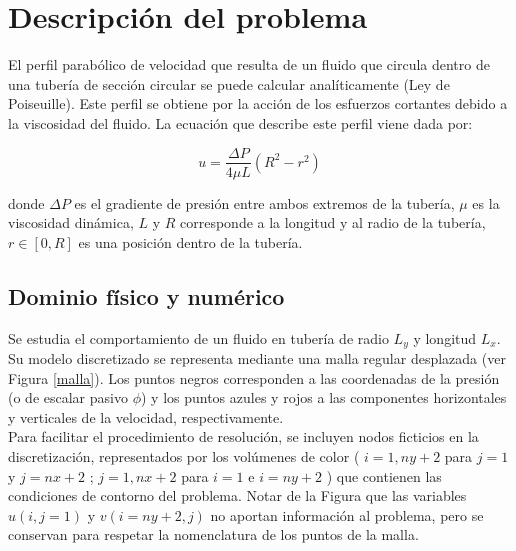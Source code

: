 \section{ Descripción del problema }

El perfil parabólico de velocidad que resulta de un fluido que circula dentro de una tubería de sección circular se puede calcular analíticamente (Ley de Poiseuille). Este perfil se obtiene por la acción de los esfuerzos cortantes debido a la viscosidad del fluido. La ecuación que describe este perfil viene dada por:

\begin{equation}
u = \dfrac{\Delta P}{4 \mu L } \left( R^2 - r^2 \right)
\end{equation} 

donde $\Delta P$ es el gradiente de presión entre ambos extremos de la tubería, $\mu$ es la viscosidad dinámica, $L$ y $R$ corresponde a la longitud y al radio de la tubería, $r \in [0,R]$ es una posición dentro de la tubería.

\subsection{Dominio físico y numérico}

Se estudia el comportamiento de un fluido en tubería de radio $L_y$ y longitud $L_x$. Su modelo discretizado se representa mediante una malla regular desplazada (ver Figura \ref{malla}). Los puntos negros corresponden a las coordenadas de la presión (o de escalar pasivo $\phi$) y los puntos azules y rojos a las componentes horizontales y verticales de la velocidad, respectivamente. \\ 

Para facilitar el procedimiento de resolución, se incluyen nodos ficticios en la discretización, representados por los volúmenes de color ( $ i=1,ny+2 $ para $ j=1 $ y $j=nx+2$ ;  $ j=1,nx+2 $ para $ i=1 $ e $i=ny+2$ ) que contienen las condiciones de contorno del problema. Notar de la Figura que las variables $u(i,j=1)$ y $v(i=ny+2,j)$ no aportan información al problema, pero se conservan para respetar la nomenclatura de los puntos de la malla.

